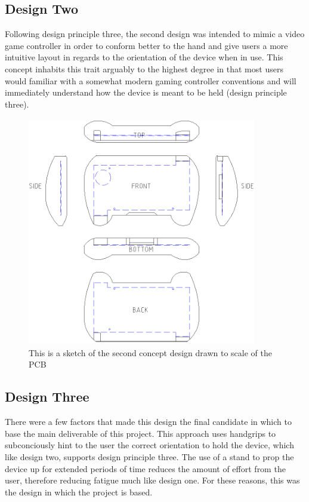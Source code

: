 \subsection{Design Two}

Following design principle three, the second design was intended to mimic a video game controller in order to conform better to the hand and give users a more intuitive layout in regards to the orientation of the device when in use. 
This concept inhabits this trait arguably to the highest degree in that most users would familiar with a somewhat modern gaming controller conventions and will immediately understand how the device is meant to be held (design principle three).

\begin{figure}[hbt!]
\centering
\includegraphics[width=10cm,height=10cm,keepaspectratio]{Figures/design2_sketch.png}
\caption{This is a sketch of the second concept design drawn to scale of the PCB}
\label{fig:Design_2}
\end{figure}

\subsection{Design Three}

There were a few factors that made this design the final candidate in which to base the main deliverable of this project.
This approach uses handgrips to subconciously hint to the user the correct orientation to hold the device, which like design two, supports design principle three.
The use of a stand to prop the device up for extended periods of time reduces the amount of effort from the user, therefore reducing fatigue much like design one.
For these reasons, this was the design in which the project is based.

